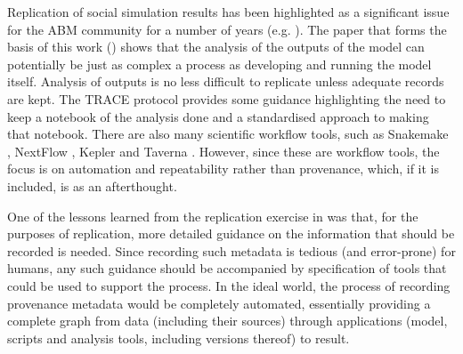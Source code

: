 \documentclass[runningheads]{llncs}
\begin{document}
Replication of social simulation results has been highlighted as a significant
issue for the ABM community for a number of years (e.g. \cite{edmonds2003replication}).
The paper that forms the basis of this work (\cite{polhill2017lessons}) shows that
the analysis of the outputs of the model can potentially be just as complex a
process as developing and running the model itself. Analysis of outputs is no less difficult
to replicate unless adequate records are kept. The TRACE protocol \cite{schmolke2010ecological,ayllon2021keeping} provides
some guidance highlighting the need to keep a notebook of the analysis done and
a standardised approach to making that notebook. There are also 
many scientific workflow tools, such as Snakemake
\cite{koster2012snakemake}, NextFlow \cite{di2017nextflow}, Kepler
\cite{ludascher2006scientific} and Taverna \cite{hull2006taverna}. However, since
these are workflow tools, the focus is on automation and
repeatability rather than provenance, which, if it is included, is as an afterthought.

One of the lessons learned from the replication exercise in
\cite{polhill2017lessons} was that, for the purposes of replication, more
detailed guidance on the information that should be recorded is needed. Since
recording such metadata is tedious (and error-prone) for humans, any such
guidance should be accompanied by specification of tools
that could be used to support the process. In the ideal world, the process
of recording provenance metadata would be completely automated, essentially providing a complete graph from data (including their sources) through applications (model, scripts and analysis tools, including versions thereof) to result.
\end{document}
